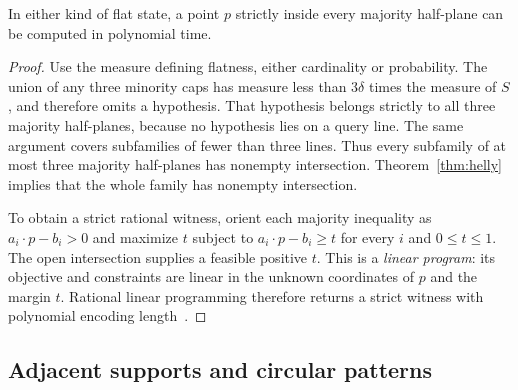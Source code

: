 \begin{lemma}\label{lem:helly}
In either kind of flat state, a point $p$ strictly inside every
majority half-plane can be computed in polynomial time.
\end{lemma}
\begin{proof}
Use the measure defining flatness, either cardinality or probability.
The union of any three minority caps has measure less than
$3\delta$ times the measure of $S$, and therefore omits a hypothesis.
That hypothesis belongs strictly to all three majority half-planes,
because no hypothesis lies on a query line. The same argument covers
subfamilies of fewer than three lines. Thus every subfamily of at
most three majority half-planes has nonempty intersection.
Theorem~\ref{thm:helly} implies
that the whole family has nonempty intersection.

To obtain a strict rational witness, orient each majority inequality
as $a_i\cdot p-b_i>0$ and maximize $t$ subject to
$a_i\cdot p-b_i\ge t$ for every $i$ and $0\le t\le1$.
The open intersection supplies a feasible positive $t$.
This is a \emph{linear program}: its objective and constraints
are linear in the unknown coordinates of $p$ and the margin $t$.
Rational linear programming therefore returns a strict witness
with polynomial encoding length~\cite{khachiyan1979}.
\end{proof}

\subsection{Adjacent supports and circular patterns}

